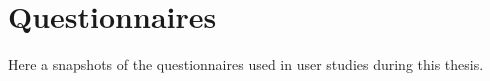 \chapter{Questionnaires} %
\label{AppendixA} %

Here a snapshots of the questionnaires used in user studies during this thesis.






